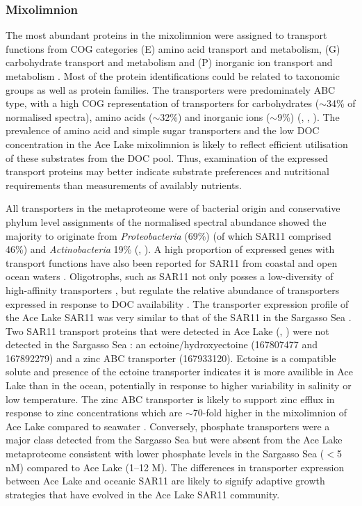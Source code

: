 \subsubsection{Mixolimnion}
The most abundant proteins in the mixolimnion were assigned to transport functions from COG categories (E) amino acid transport and metabolism, (G) carbohydrate transport and metabolism and (P) inorganic ion transport and metabolism . 
Most of the protein identifications could be related to taxonomic groups as well as protein families.
The transporters were predominately \ac{ABC} type, with a high \ac{COG} representation of transporters for carbohydrates ($\sim$34\% of normalised spectra), amino acids ($\sim$32\%) and inorganic ions ($\sim$9\%) (, ,  ).
The prevalence of amino acid and simple sugar transporters and the low \ac{DOC} concentration in the Ace Lake mixolimnion  is likely to reflect efficient utilisation of these substrates from the \ac{DOC} pool.
Thus, examination of the expressed transport proteins may better indicate substrate preferences and nutritional requirements than measurements of availably nutrients.

All transporters in the metaproteome were of bacterial origin and conservative phylum level assignments of the normalised spectral abundance showed the majority to originate from \emph{Proteobacteria} (69\%) (of which SAR11 comprised 46\%) and \emph{Actinobacteria} 19\% (, ). 
A high proportion of expressed genes with transport functions have also been reported for SAR11 from coastal \cite{Poretsky2010} and open ocean waters \cite{Sowell2009, Morris2010}. 
Oligotrophs, such as SAR11 not only posses a low-diversity of high-affinity transporters \cite{Lauro2009}, but regulate the relative abundance of transporters expressed in response to \ac{DOC} availability \cite{Poretsky2010}. 
The transporter expression profile of the Ace Lake SAR11 was very similar to that of the SAR11 in the Sargasso Sea \cite{Sowell2009}.
Two SAR11 transport proteins that were detected in Ace Lake (, ) were not detected in the Sargasso Sea \cite{Sowell2009}: an ectoine/hydroxyectoine (167807477 and 167892279) and a zinc \ac{ABC} transporter (167933120). 
Ectoine is a compatible solute and presence of the ectoine transporter indicates it is more availible in Ace Lake than in the ocean, potentially in response to higher variability in salinity or low temperature.
The zinc \ac{ABC} transporter is likely to support zinc efflux in response to zinc concentrations which are $\sim$70-fold higher in the mixolimnion of Ace Lake compared to seawater \cite{Rankin1999}. 
Conversely, phosphate transporters were a major class detected from the Sargasso Sea \cite{Sowell2009} but were absent from the Ace Lake metaproteome consistent with lower phosphate levels in the Sargasso Sea ($<$5 nM) compared to Ace Lake (1--12 \textmu{}M). 
The differences in transporter expression between Ace Lake and oceanic SAR11 are likely to signify adaptive growth strategies that have evolved in the Ace Lake SAR11 community.

